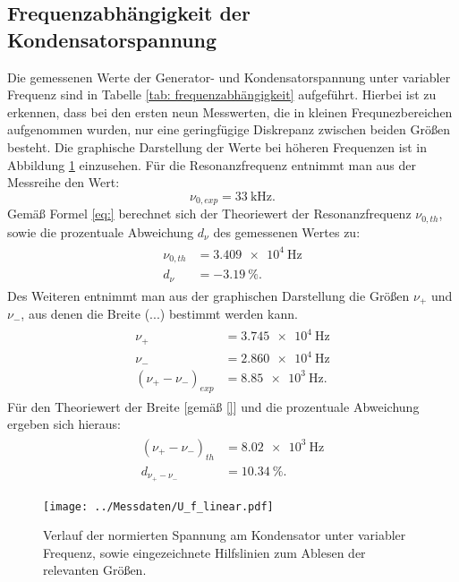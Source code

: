 \subsection{Frequenzabhängigkeit der Kondensatorspannung}
Die gemessenen Werte der Generator- und Kondensatorspannung unter variabler Frequenz sind in Tabelle \ref{tab: frequenzabhängigkeit} aufgeführt.
Hierbei ist zu erkennen, dass bei den ersten neun Messwerten, die in kleinen Frequnezbereichen aufgenommen wurden, nur eine geringfügige
Diskrepanz zwischen beiden Größen besteht. Die graphische Darstellung der Werte bei höheren Frequenzen ist in Abbildung \ref{fig: spannungsverlauf_U_C}
einzusehen. Für die Resonanzfrequenz entnimmt man aus der Messreihe den Wert:
\begin{equation}
  \nu_{0, exp} = \SI{33}{\kilo\hertz}.
  \label{eq: exp_resonanzfrequenz}
\end{equation}
Gemäß Formel \eqref{eq:} berechnet sich der Theoriewert der Resonanzfrequenz $\nu_{0, th}$, sowie die prozentuale Abweichung $d_{\nu}$ des gemessenen Wertes zu:
\begin{align}
  \begin{aligned}
  \nu_{0, th} &= \SI{3.409e4}{\hertz} \\
  d_{\nu} &= \SI{-3.19}{\percent}.
\end{aligned}
\label{eq: theo_resonanzfrequenz}
\end{align}
Des Weiteren entnimmt man aus der graphischen Darstellung die Größen $\nu_+$ und $\nu_-$, aus denen die Breite (...) bestimmt werden kann.
\begin{align}
  \begin{aligned}
  \nu_{+} &= \SI{3.745e4}{\hertz} \\
  \nu_{-} &= \SI{2.860e4}{\hertz} \\
  (\nu_{+}-\nu_{-})_{exp} &= \SI{8.85e3}{\hertz}.
\end{aligned}
\label{eq: breite_exp}
\end{align}
Für den Theoriewert der Breite [gemäß \eqref{}] und die prozentuale Abweichung ergeben sich hieraus:
\begin{align}
  \begin{aligned}
  (\nu_{+}-\nu_{-})_{th} &= \SI{8.02e3}{\hertz}\\
  d_{\nu_{+}-\nu_{-}} &= \SI{10.34}{\percent}.
\end{aligned}
\label{eq: theo_breite}
\end{align}
\begin{figure}
  \centering
  \texttt{[image: ../Messdaten/U\_f\_linear.pdf]}
  \caption{Verlauf der normierten Spannung am Kondensator unter variabler Frequenz, sowie eingezeichnete Hilfslinien zum Ablesen der relevanten Größen.}
  \label{fig: spannungsverlauf_U_C}
\end{figure}
